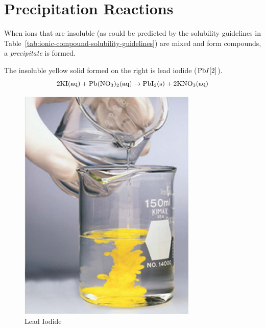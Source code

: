 \documentclass[
	chapter=4
]{chem122notes}
\begin{document}
\section{Precipitation Reactions}\label{sec:precipitation-reactions}
When ions that are insoluble (as could be predicted by the solubility guidelines in Table~\ref{tab:ionic-compound-solubility-guidelines}) are mixed and form compounds, a \emph{precipitate} is formed.\\

\begin{minipage}[m]{0.6\textwidth}
	The insoluble yellow solid formed on the right is lead iodide ($\element{Pb}{I}[2]$).
	\[ 2\element{K}\element{I} (\mbox{aq}) + \element{Pb}(\element{N}\element{O}_{3})_{2} (\mbox{aq}) \rightarrow \element{Pb}\element{I}_{2} (\mbox{s}) + 2\element{K}\element{N}\element{O}[3] (\mbox{aq}) \]
\end{minipage}\hfill%
\begin{minipage}[t]{0.4\textwidth}
	\begin{figure}[H]
		\centering
		\includegraphics[width=\textwidth]{chapter4/lead_iodide}
		\caption{Lead Iodide}
		\label{fig:lead-iodide}
	\end{figure}
\end{minipage}
\end{document}
